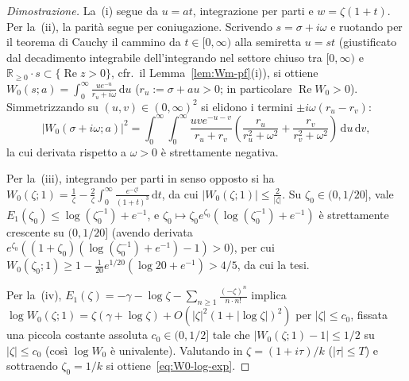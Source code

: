 \documentclass[11pt, reqno]{amsart}
\theoremstyle{remark}
\numberwithin{equation}{section}
\DeclareMathOperator{\re}{Re}
\newcommand{\R}{\mathbb{R}}
\newcommand{\dd}{\,\mathrm{d}}
\begin{document}
\begin{proof}[Dimostrazione]
La~(i) segue da $u = a t$, integrazione per parti e $w = \zeta(1+t)$.
Per la~(ii), la parità segue per coniugazione. Scrivendo $s = \sigma + i\omega$ e ruotando per il
teorema di Cauchy il cammino da $t \in [0,\infty)$ alla semiretta $u = s t$ (giustificato dal decadimento
integrabile dell'integrando nel settore chiuso tra $[0,\infty)$ e $\R_{\ge 0}\cdot s \subset \{\re z > 0\}$,
cfr.\ il Lemma~\ref{lem:Wm-pf}(i)), si ottiene $W_0(s;a) = \int_0^\infty \frac{u e^{-u}}{r_u + i\omega}\dd u$
($r_u := \sigma + a u > 0$; in particolare $\re W_0 > 0$). Simmetrizzando su $(u,v) \in (0,\infty)^2$
si elidono i termini $\pm i\omega(r_u - r_v)$:
\[
|W_0(\sigma+i\omega; a)|^2
= \int_0^\infty\!\!\int_0^\infty \frac{u v e^{-u-v}}{r_u + r_v}
\left(\frac{r_u}{r_u^2+\omega^2} + \frac{r_v}{r_v^2+\omega^2}\right)\dd u\dd v,
\]
la cui derivata rispetto a $\omega > 0$ è strettamente negativa.

Per la~(iii), integrando per parti in senso opposto si ha
$W_0(\zeta;1) = \frac{1}{\zeta} - \frac{2}{\zeta}\int_0^\infty \frac{e^{-\zeta t}}{(1+t)^3}\dd t$, da cui
$|W_0(\zeta;1)| \le \frac{2}{|\zeta|}$. Su $\zeta_0 \in (0, 1/20]$, vale
$E_1(\zeta_0) \le \log(\zeta_0^{-1}) + e^{-1}$, e $\zeta_0 \mapsto \zeta_0 e^{\zeta_0}(\log(\zeta_0^{-1})+e^{-1})$
è strettamente crescente su $(0, 1/20]$ (avendo derivata $e^{\zeta_0}((1+\zeta_0)(\log(\zeta_0^{-1})+e^{-1}) - 1) > 0$),
per cui $W_0(\zeta_0;1) \ge 1 - \frac{1}{20}e^{1/20}(\log 20 + e^{-1}) > 4/5$, da cui la tesi.

Per la~(iv), $E_1(\zeta) = -\gamma - \log\zeta - \sum_{n\ge 1} \frac{(-\zeta)^n}{n\cdot n!}$ implica
$\log W_0(\zeta;1) = \zeta(\gamma + \log\zeta) + O(|\zeta|^2(1+|\log\zeta|)^2)$ per $|\zeta| \le c_0$,
fissata una piccola costante assoluta $c_0 \in (0, 1/2]$ tale che $|W_0(\zeta;1) - 1| \le 1/2$ su $|\zeta| \le c_0$ (così $\log W_0$ è univalente).
Valutando in $\zeta = (1+i\tau)/k$ ($|\tau| \le T$) e sottraendo $\zeta_0 = 1/k$ si ottiene~\eqref{eq:W0-log-exp}.
\end{proof}
\end{document}
